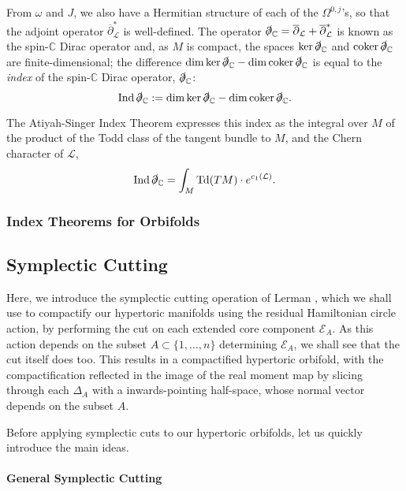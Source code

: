 \documentclass{amsart}
\newcommand{\w}{\omega}
\newcommand{\CC}{\mathbb{C}}
\newcommand{\mcE}{\mathcal{E}}
\newcommand{\mcL}{\mathcal{L}}
\newcommand{\dbar}{\overline{\partial}}
\DeclareMathOperator{\Td}{Td}
\DeclareMathOperator{\Ind}{Ind}
\DeclareMathOperator{\coker}{coker}
\begin{document}
    From $\w$ and $J$, we also have a Hermitian structure of each of the $\Omega^{0,j}$'s, so that the adjoint operator $\dbar_{\mcL}^{\ast}$ is well-defined. The operator $\slashed{\partial}_{\CC} = \dbar_{\mcL} + \dbar_{\mcL}^{\ast}$ is known as the spin-$\CC$ Dirac operator and, as $M$ is compact, the spaces $\ker \slashed{\partial}_{\CC}$ and $\coker \slashed{\partial}_{\CC}$ are finite-dimensional; the difference $\dim \ker \slashed{\partial}_{\CC} - \dim \coker \slashed{\partial}_{\CC}$ is equal to the \emph{index} of the spin-$\CC$ Dirac operator, $\slashed{\partial}_{\CC}$:
    \[
        \Ind \slashed{\partial}_{\CC} := \dim \ker \slashed{\partial}_{\CC} - \dim \coker \slashed{\partial}_{\CC}.
    \]
	
    The Atiyah-Singer Index Theorem expresses this index as the integral over $M$ of the product of the Todd class of the tangent bundle to $M$, and the Chern character of $\mcL$,
    \[
        \Ind \slashed{\partial}_{\CC} = \int_{M} \Td(TM) \cdot e^{c_{1}(\mcL)}.
    \]	
    
    \subsubsection{Index Theorems for Orbifolds}
    
    

	\subsection{Symplectic Cutting}
	
	Here, we introduce the symplectic cutting operation of Lerman \cite{Ler95}, which we shall use to compactify our hypertoric manifolds using the residual Hamiltonian circle action, by performing the cut on each extended core component $\mcE_{A}$. As this action depends on the subset $A \subset \{1, \ldots, n\}$ determining $\mcE_{A}$, we shall see that the cut itself does too. This results in a compactified hypertoric orbifold, with the compactification reflected in the image of the real moment map by slicing through each $\Delta_{A}$ with a inwards-pointing half-space, whose normal vector depends on the subset $A$.
	
	Before applying symplectic cuts to our hypertoric orbifolds, let us quickly introduce the main ideas.
	
	\paragraph{General Symplectic Cutting}
	
\end{document}
